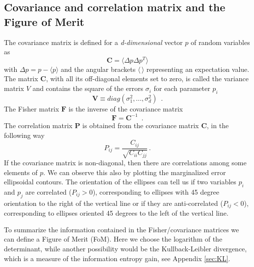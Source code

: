 \subsection{Covariance and correlation matrix and the Figure of Merit\label{sec:covcorr}}

The covariance matrix is defined for a \emph{d-dimensional }vector
$p$ of random variables as
\begin{equation}
\mathbf{C}=\langle \Delta p \Delta p^{T} \rangle\label{eq:covariance_def}
\end{equation}
with $\Delta p = p - \langle p \rangle$ and the angular brackets $\langle \, \rangle$ representing an expectation value. 
The matrix $\mathbf{C}$, with all its off-diagonal elements set to zero, is called the variance matrix $V$ and contains the
square of the errors $\sigma_{i}$ for each parameter
$p_{i}$
\begin{equation}
\mathbf{V} \equiv diag(\sigma_{1}^{2},...,\sigma_{d}^{2})\,\,\,.
\end{equation}
The Fisher matrix $\mathbf{F}$ is the inverse of the covariance matrix
\begin{equation}
\mathbf F= \mathbf C^{-1}\,\,\,.
\end{equation}
The correlation matrix $\mathbf P$ is obtained from the covariance matrix
$\mathbf C$, in the following way
\begin{equation}
P_{ij}=\frac{C_{ij}}{\sqrt{C_{ii}C_{jj}}} \, . \label{eq:correlation_def}
\end{equation}
If the covariance matrix is non-diagonal, then there are correlations
among some elements of $p$. We can observe this also by plotting
the marginalized error ellipsoidal contours. The orientation of the ellipses can
tell us if two variables $p_{i}$ and $p_{j}$ are correlated ($P_{ij}>0$),
corresponding to ellipses with 45 degree orientation to the right of the vertical
line or if they are anti-correlated ($P_{ij}<0$), corresponding to ellipses oriented 45
degrees to the left of the vertical line.

To summarize the information contained in the Fisher/covariance matrices we can
define a Figure of Merit (FoM). Here we choose the logarithm of the determinant, while another possibility would
be the Kullback-Leibler divergence, which is a measure of the information entropy gain, see Appendix \ref{sec:KL}.


